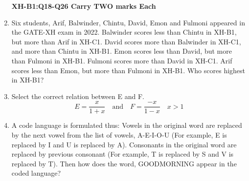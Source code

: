 \documentclass[12pt]{article}
\theoremstyle{remark}
\begin{document}
\begin{enumerate}
\begin{enumerate}
\end{enumerate}
\hfill{}
\newpage
\textbf{XH-B1:Q18-Q26 Carry TWO marks Each}
\item Six students, Arif, Balwinder, Chintu, David, Emon and Fulmoni appeared in the GATE-XH exam in 2022. Balwinder scores less than Chintu in XH-B1, but more than Arif in XH-C1. David scores more than Balwinder in XH-C1, and more than Chintu in XH-B1. Emon scores less than David, but more than Fulmoni in XH-B1. Fulmoni scores more than David in XH-C1. Arif scores less than Emon, but more than Fulmoni in XH-B1. Who scores highest in XH-B1?
\begin{enumerate}  \end{enumerate}
\hfill{}
\item Select the correct relation between E and F.
$$ E = \frac{x}{1 + x} \quad \text{and} \quad F = \frac{-x}{1 - x} \quad x > 1 $$ 
\begin{enumerate}  \end{enumerate}
\hfill{}
\item A code language is formulated thus: Vowels in the original word are replaced by the next vowel from the list of vowels, A-E-I-O-U (For example, E is replaced by I and U is replaced by A). Consonants in the original word are replaced by previous consonant (For example, T is replaced by S and V is replaced by T). Then how does the word, GOODMORNING appear in the coded language?
\begin{enumerate}  \end{enumerate}

\end{enumerate}
\end{document}
